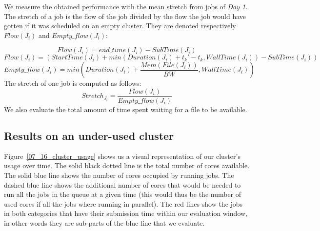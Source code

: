 \documentclass[conference,10pt]{IEEEtran}
\newcommand{\file}{\ensuremath{\mathit{File}}\xspace}
\newcommand{\memory}{\ensuremath{\mathit{Mem}}\xspace}
\newcommand{\duration}{\mathit{Duration}\xspace}
\newcommand{\bandwidth}{\mathit{BW}\xspace}
\newcommand{\submissiontime}{\mathit{SubTime}\xspace}
\newcommand{\walltime}{\mathit{WallTime}\xspace}
\newcommand{\start}{\mathit{StartTime}\xspace}
\begin{document}
We measure the obtained performance with the mean
stretch from jobs of \textit{Day 1}.
The stretch of a job is the flow of the job divided
by the flow the job would have gotten if it was scheduled on an empty cluster.
They are denoted respectively $Flow(J_i)$ and $Empty\_flow(J_i)$:

$$
Flow(J_i) = end\_time(J_i) - \submissiontime(J_i)
$$
$$
Flow(J_i) = (\start(J_i) + min(\duration(J_i) + t_k' - t_k, \walltime(J_i)) - \submissiontime(J_i))
$$
$$
	Empty\_flow(J_i) = min(\duration(J_i) + \frac{\memory(\file(J_i))}{\bandwidth}, \walltime(J_i))
$$
The stretch of one job is computed as follows:
$$
	Stretch_{J_i} = \frac{Flow(J_i)}{Empty\_flow(J_i)}
$$
We also evaluate the total amount of time spent waiting for a file to be available.

\subsection{Results on an under-used cluster}

Figure~\ref{07_16_cluster_usage} shows us a visual representation of 
our cluster's usage over time. The solid black dotted line is the total
number of cores available.
The solid blue line shows the number of cores occupied by running jobs.
The dashed blue line shows the additional number of cores that would be needed
to run all the jobs in the queue at a given time (this would thus be the number
of used cores if all the jobs where running in parallel).
The red lines show the jobs in both categories that have their submission
time within our evaluation window, in other words they are sub-parts of the blue line
that we evaluate.
\end{document}
